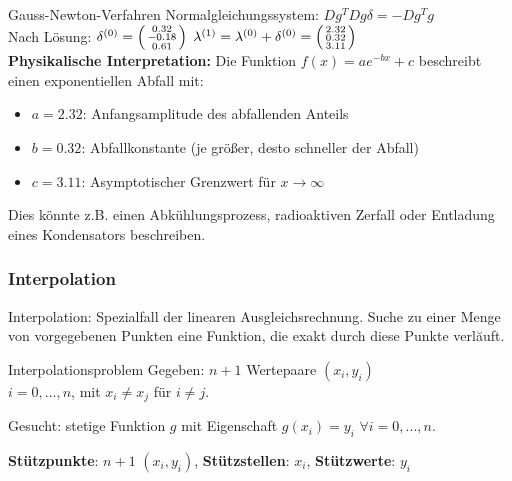 \begin{example2}{Gauss-Newton-Verfahren}
Normalgleichungssystem: $Dg^T Dg \delta = -Dg^T g$
\vspace{2mm}\\
Nach Lösung: $\delta^{(0)} = \begin{psmallmatrix} 0.32 \\ -0.18 \\ 0.61 \end{psmallmatrix}$
$\lambda^{(1)} = \lambda^{(0)} + \delta^{(0)} = \begin{psmallmatrix} 2.32 \\ 0.32 \\ 3.11 \end{psmallmatrix}$
\vspace{2mm}\\
\textbf{Physikalische Interpretation:}
Die Funktion $f(x) = ae^{-bx} + c$ beschreibt einen exponentiellen Abfall mit:
\begin{itemize}
    \item $a = 2.32$: Anfangsamplitude des abfallenden Anteils
    \item $b = 0.32$: Abfallkonstante (je größer, desto schneller der Abfall)
    \item $c = 3.11$: Asymptotischer Grenzwert für $x \rightarrow \infty$
\end{itemize}
Dies könnte z.B. einen Abkühlungsprozess, radioaktiven Zerfall oder Entladung eines Kondensators beschreiben.
\end{example2}

\subsubsection{Interpolation}

\begin{remark}
Interpolation: Spezialfall der linearen Ausgleichsrechnung. Suche zu einer Menge von vorgegebenen Punkten eine Funktion, die exakt durch diese Punkte verlăuft.
\end{remark}

\begin{definition}{Interpolationsproblem}
Gegeben: $n+1$ Wertepaare $(x_i, y_i)$\\ $i = 0, ..., n$, mit $x_i \neq x_j$ für $i \neq j$. 

Gesucht: stetige Funktion $g$ mit Eigenschaft $g(x_i) = y_i$ $\forall i = 0, ..., n$.

\textbf{Stützpunkte}: $n+1$ $(x_i, y_i)$, \textbf{Stützstellen}: $x_i$, \textbf{Stützwerte}: $y_i$
\end{definition}

